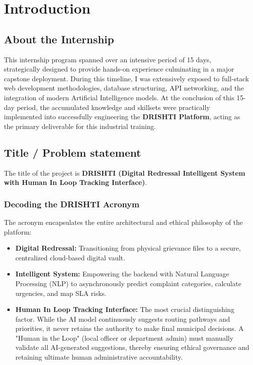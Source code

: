 \documentclass[12pt,a4paper]{report}
\begin{document}
\chapter{Introduction}

\section{About the Internship}
This internship program spanned over an intensive period of 15 days, strategically designed to provide hands-on experience culminating in a major capstone deployment. During this timeline, I was extensively exposed to full-stack web development methodologies, database structuring, API networking, and the integration of modern Artificial Intelligence models. At the conclusion of this 15-day period, the accumulated knowledge and skillsets were practically implemented into successfully engineering the \textbf{DRISHTI Platform}, acting as the primary deliverable for this industrial training.

\section{Title / Problem statement}
The title of the project is \textbf{DRISHTI (Digital Redressal Intelligent System with Human In Loop Tracking Interface)}. \\

\subsection*{Decoding the DRISHTI Acronym}
The acronym encapsulates the entire architectural and ethical philosophy of the platform:
\begin{itemize}
    \item \textbf{Digital Redressal:} Transitioning from physical grievance files to a secure, centralized cloud-based digital vault.
    \item \textbf{Intelligent System:} Empowering the backend with Natural Language Processing (NLP) to asynchronously predict complaint categories, calculate urgencies, and map SLA risks.
    \item \textbf{Human In Loop Tracking Interface:} The most crucial distinguishing factor. While the AI model continuously suggests routing pathways and priorities, it never retains the authority to make final municipal decisions. A "Human in the Loop" (local officer or department admin) must manually validate all AI-generated suggestions, thereby ensuring ethical governance and retaining ultimate human administrative accountability.
\end{itemize}
\end{document}
